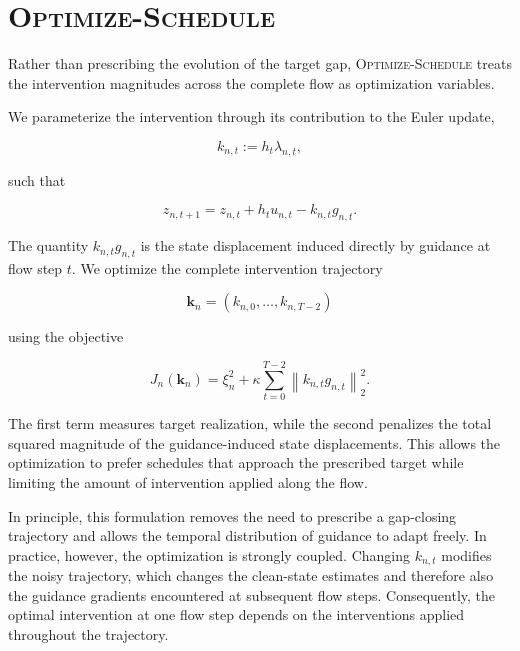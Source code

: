 \section{\textsc{Optimize-Schedule}}
\label{app:optimize-schedule}

Rather than prescribing the evolution of the target gap,
\textsc{Optimize-Schedule} treats the intervention magnitudes across the
complete flow as optimization variables.

We parameterize the intervention through its contribution to the Euler update,

\begin{equation}
    k_{n,t}
    :=
    h_t\lambda_{n,t},
\end{equation}

such that

\begin{equation}
    z_{n,t+1}
    =
    z_{n,t}
    +
    h_tu_{n,t}
    -
    k_{n,t}g_{n,t}.
\end{equation}

The quantity $k_{n,t}g_{n,t}$ is the state displacement induced directly by
guidance at flow step $t$. We optimize the complete intervention trajectory

\begin{equation}
    \mathbf{k}_n
    =
    \left(
        k_{n,0},\ldots,k_{n,T-2}
    \right)
\end{equation}

using the objective

\begin{equation}
    J_n(\mathbf{k}_n)
    =
    \xi_n^2
    +
    \kappa
    \sum_{t=0}^{T-2}
    \left\|
        k_{n,t}g_{n,t}
    \right\|_2^2.
    \label{eq:app-optimize-schedule-objective}
\end{equation}

The first term measures target realization, while the second penalizes the
total squared magnitude of the guidance-induced state displacements. This
allows the optimization to prefer schedules that approach the prescribed
target while limiting the amount of intervention applied along the flow.

In principle, this formulation removes the need to prescribe a gap-closing
trajectory and allows the temporal distribution of guidance to adapt freely.
In practice, however, the optimization is strongly coupled. Changing
$k_{n,t}$ modifies the noisy trajectory, which changes the clean-state
estimates and therefore also the guidance gradients encountered at subsequent
flow steps. Consequently, the optimal intervention at one flow step depends on
the interventions applied throughout the trajectory.

